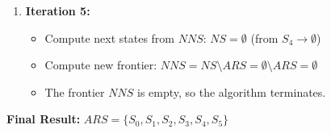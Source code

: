 \documentclass[12pt,a4paper]{article}
\begin{document}
\begin{enumerate}
\begin{itemize}
        \item Update $ARS$: $ARS = ARS \cup NNS = \{S_0, S_1, S_2, S_3, S_4, S_5\}$
    \end{itemize}
    \item \textbf{Iteration 5:}
    \begin{itemize}
        \item Compute next states from $NNS$: $NS = \emptyset$ (from $S_4 \rightarrow \emptyset$)
        \item Compute new frontier: $NNS = NS \setminus ARS = \emptyset \setminus ARS = \emptyset$
        \item The frontier $NNS$ is empty, so the algorithm terminates.
    \end{itemize}
\end{enumerate}

\textbf{Final Result:} $ARS = \{S_0, S_1, S_2, S_3, S_4, S_5\}$
\end{document}
